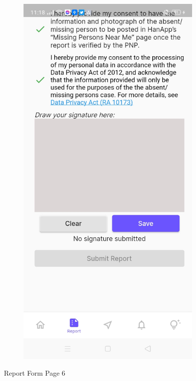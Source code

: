 \begin{figure}[!h]
\begin{subfigure}[c]{0.40\linewidth}
    \end{subfigure}
    \centering
    \begin{subfigure}[c]{0.40\linewidth}
        \centering
        \includegraphics[scale=0.15]{figures/Chapter4/Main/p6-2.jpg}
    \end{subfigure}
    \caption{Report Form Page 6}
    \label{fig:ReportPage6}
\end{figure}

